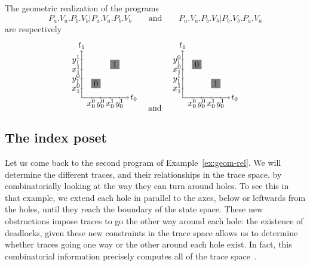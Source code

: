 \documentclass[orivec]{llncs} \usepackage[T1]{fontenc}
\renewcommand{\P}[1]{P_{#1}}
\newcommand{\V}[1]{V_{#1}}
\newcommand{\qtand}{\quad\text{and}\quad}
\begin{document}
\begin{example}
  \label{ex:geom-rel}
  The geometric realization of the programs
  \[
  \P a.\V a.\P b.\V b|\P a.\V a.\P b.\V b
  \qquad\text{and}\qquad
  \P a.\V a.\P b.\V b|\P b.\V b.\P a.\V a
  \]
  are respectively
  \vspace{-4ex}
  \[
  \begin{tikzpicture}[scale=.4]
    \draw[->] (0,0) -- (5,0);
    \draw[->] (0,0) -- (0,5);
    \draw (5.5,0) node {$t_0$};
    \draw (0,5.5) node {$t_1$};
    \fill[fill=gray] (1,1) -- (2,1) -- (2,2) -- (1,2) -- cycle;
    \fill[fill=gray] (3,3) -- (4,3) -- (4,4) -- (3,4) -- cycle;
    \draw (1.5,1.5) node {$0$};
    \draw (3.5,3.5) node {$1$};
    \foreach \x in {1,2,3,4} \draw (\x,-1mm) -- (\x,1mm);
    \foreach \x in {1,2,3,4} \draw (-1mm,\x) -- (1mm,\x);
    \draw (1,-.6) node {$x^0_0$};
    \draw (2,-.6) node {$y^0_0$};
    \draw (3,-.6) node {$x^1_0$};
    \draw (4,-.6) node {$y^1_0$};
    \draw (-.6,1) node {$x^0_1$};
    \draw (-.6,2) node {$y^0_1$};
    \draw (-.6,3) node {$x^1_1$};
    \draw (-.6,4) node {$y^1_1$};
  \end{tikzpicture}
  \qtand
  \begin{tikzpicture}[scale=.4]
    \draw[->] (0,0) -- (5,0);
    \draw[->] (0,0) -- (0,5);
    \draw (5.5,0) node {$t_0$};
    \draw (0,5.5) node {$t_1$};
    \fill[fill=gray] (1,3) -- (2,3) -- (2,4) -- (1,4) -- cycle;
    \fill[fill=gray] (3,1) -- (4,1) -- (4,2) -- (3,2) -- cycle;
    \draw (1.5,3.5) node {$0$};
    \draw (3.5,1.5) node {$1$};
    \foreach \x in {1,2,3,4} \draw (\x,-1mm) -- (\x,1mm);
    \foreach \x in {1,2,3,4} \draw (-1mm,\x) -- (1mm,\x);
    \draw (1,-.6) node {$x^0_0$};
    \draw (2,-.6) node {$y^0_0$};
    \draw (3,-.6) node {$x^1_0$};
    \draw (4,-.6) node {$y^1_0$};
    \draw (-.6,1) node {$x^1_1$};
    \draw (-.6,2) node {$y^1_1$};
    \draw (-.6,3) node {$x^0_1$};
    \draw (-.6,4) node {$y^0_1$};
  \end{tikzpicture}
  \]
\end{example}

\subsection{The index poset}
\label{indexposet}
Let us come back to the second program of Example~\ref{ex:geom-rel}.  We will
determine the different traces, and their relationships in the trace space, by
combinatorially looking at the way they can turn around holes. To see this in
that example, we extend each hole in parallel to the axes, below or leftwards
from the holes, until they reach the boundary of the state space. These new
obstructions impose traces to go the other way around each hole: the existence
of deadlocks, given these new constraints in the trace space allows us to
determine whether traces going one way or the other around each hole exist. In
fact, this combinatorial information precisely computes all of the trace
space~\cite{raussen2010simplicial}.
\end{document}
